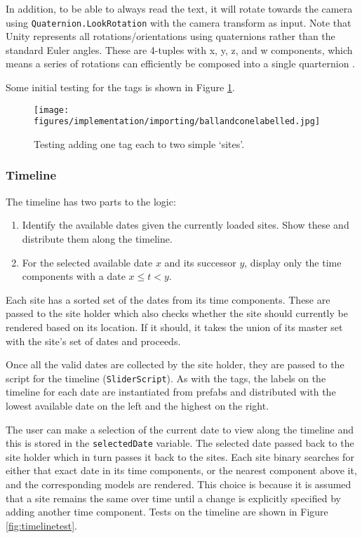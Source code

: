 \documentclass[12pt, a4paper]{article}
\begin{document}
In addition, to be able to always read the text, it will rotate towards the camera using \verb|Quaternion.LookRotation| with the camera transform as input. Note that Unity represents all rotations/orientations using quaternions rather than the standard Euler angles. These are 4-tuples with x, y, z, and w components, which means a series of rotations can efficiently be composed into a single quarternion \cite{models:quaternions}.

Some initial testing for the tags is shown in Figure 
\ref{fig:ballconetag}.
\begin{figure}[h]
    \centering
    \texttt{[image: figures/implementation/importing/ballandconelabelled.jpg]}
        \caption{Testing adding one tag each to two simple `sites'.}
        \label{fig:ballconetag}
\end{figure}

\subsubsection{Timeline}
The timeline has two parts to the logic:
\begin{enumerate}
    \item Identify the available dates given the currently loaded sites. Show these and distribute them along the timeline.
    \item For the selected available date $x$ and its successor $y$, display only the time components with a date $x \leq t < y$.
\end{enumerate}

Each site has a sorted set of the dates from its time components. These are passed to the site holder which also checks whether the site should currently be rendered based on its location. If it should, it takes the union of its master set with the site's set of dates and proceeds.

Once all the valid dates are collected by the site holder, they are passed to the script for the timeline (\verb|SliderScript|). As with the tags, the labels on the timeline for each date are instantiated from prefabs and distributed with the lowest available date on the left and the highest on the right. 

The user can make a selection of the current date to view along the timeline and this is stored in the \verb|selectedDate| variable. The selected date passed back to the site holder which in turn passes it back to the sites. Each site binary searches for either that exact date in its time components, or the nearest component above it, and the corresponding models are rendered. This choice is because it is assumed that a site remains the same over time until a change is explicitly specified by adding another time component. Tests on the timeline are shown in Figure \ref{fig:timelinetest}.
\end{document}
